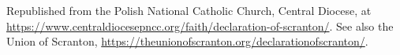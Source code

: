 \documentclass[11pt,letterpaper]{article}
\begin{document}
\color{ink}



\vspace{2em}
{\small\noindent Republished from the Polish National Catholic Church, Central
Diocese, at
\url{https://www.centraldiocesepncc.org/faith/declaration-of-scranton/}.
See also the Union of Scranton,
\url{https://theunionofscranton.org/declarationofscranton/}.\par}
\end{document}
